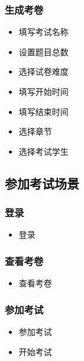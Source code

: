 \documentclass[hyperref, a4paper]{ctexart}
\providecommand{\tightlist}{%
  \setlength{\itemsep}{0pt}\setlength{\parskip}{0pt}}
\begin{document}
\hypertarget{ux751fux6210ux8003ux5377-1}{%
\subsubsection{生成考卷}\label{ux751fux6210ux8003ux5377-1}}

\begin{itemize}
\tightlist
\item
  填写考试名称
\item
  设置题目总数
\item
  选择试卷难度
\item
  填写开始时间
\item
  填写结束时间
\item
  选择章节
\item
  选择考试学生
\end{itemize}

\hypertarget{ux53c2ux52a0ux8003ux8bd5ux573aux666f}{%
\subsection{参加考试场景}\label{ux53c2ux52a0ux8003ux8bd5ux573aux666f}}

\hypertarget{ux767bux5f55-2}{%
\subsubsection{登录}\label{ux767bux5f55-2}}

\begin{itemize}
\tightlist
\item
  登录
\end{itemize}

\hypertarget{ux67e5ux770bux8003ux5377-1}{%
\subsubsection{查看考卷}\label{ux67e5ux770bux8003ux5377-1}}

\begin{itemize}
\tightlist
\item
  查看考卷
\end{itemize}

\hypertarget{ux53c2ux52a0ux8003ux8bd5-1}{%
\subsubsection{参加考试}\label{ux53c2ux52a0ux8003ux8bd5-1}}

\begin{itemize}
\tightlist
\item
  参加考试
\item
  开始考试
\end{itemize}
\end{document}
